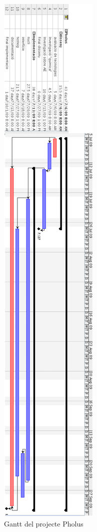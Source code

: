 \begin{figure}[h]
	\begin{center}
		\includegraphics[scale=0.39]{pholus/pholus-gantt.png}
	\end{center}
	\caption{Gantt del projecte Pholus}
	\label{fig:pholus-gantt}
\end{figure}

